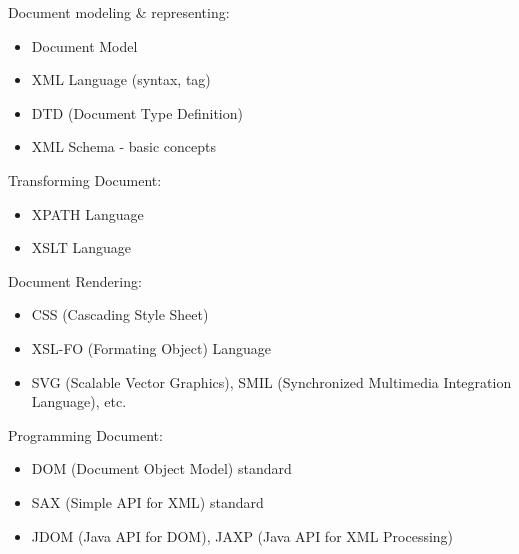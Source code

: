 Document modeling \& representing:
\begin{itemize}
    \item Document Model
    \item XML Language (syntax, tag)
    \item DTD (Document Type Definition)
    \item XML Schema - basic concepts
\end{itemize}
Transforming Document:
\begin{itemize}
    \item XPATH Language
    \item XSLT Language
\end{itemize}
Document Rendering:
\begin{itemize}
    \item CSS (Cascading Style Sheet)
    \item XSL-FO (Formating Object) Language
    \item SVG (Scalable Vector Graphics), SMIL (Synchronized Multimedia Integration Language), etc.
\end{itemize}
Programming Document:
\begin{itemize}
    \item DOM (Document Object Model) standard
    \item SAX (Simple API for XML) standard
    \item JDOM (Java API for DOM), JAXP (Java API for XML Processing)
\end{itemize}